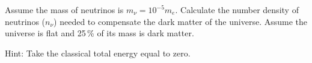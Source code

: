 Assume the mass of neutrinos is $m_\nu = 10^{-5}m_e$. Calculate the number
density of neutrinos ($n_\nu$) needed to compensate the dark matter of the
universe. Assume the universe is flat and 25\,\% of its mass is dark matter.

Hint: Take the classical total energy equal to zero.
